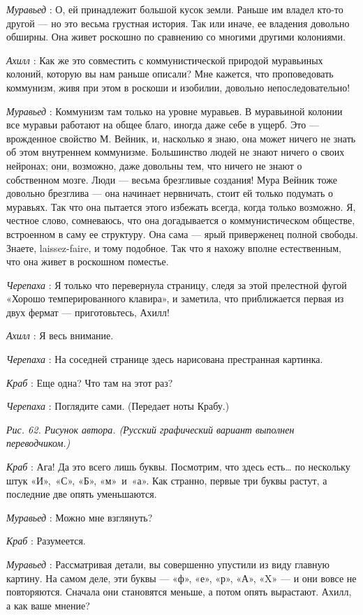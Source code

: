 \documentclass[../main.tex]{subfiles}
\begin{document}
\begin{dialogue}
\emph{Муравьед} : О, ей принадлежит большой кусок земли. Раньше им владел кто-то другой --- но это весьма грустная история. Так или иначе, ее владения довольно обширны. Она живет роскошно по сравнению со многими другими колониями.

\emph{Ахилл} : Как же это совместить с коммунистической природой муравьиных колоний, которую вы нам раньше описали? Мне кажется, что проповедовать коммунизм, живя при этом в роскоши и изобилии, довольно непоследовательно!

\emph{Муравьед} : Коммунизм там только на уровне муравьев. В муравьиной колонии все муравьи работают на общее благо, иногда даже себе в ущерб. Это --- врожденное свойство М. Вейник, и, насколько я знаю, она может ничего не знать об этом внутреннем коммунизме. Большинство людей не знают ничего о своих нейронах; они, возможно, даже довольны тем, что ничего не знают о собственном мозге. Люди --- весьма брезгливые создания! Мура Вейник тоже довольно брезглива --- она начинает нервничать, стоит ей только подумать о муравьях. Так что она пытается этого избежать всегда, когда только возможно. Я, честное слово, сомневаюсь, что она догадывается о коммунистическом обществе, встроенном в саму ее структуру. Она сама --- ярый приверженец полной свободы. Знаете, laissez-faire, и тому подобное. Так что я нахожу вполне естественным, что она живет в роскошном поместье.

\emph{Черепаха} : Я только что перевернула страницу, следя за этой прелестной фугой «Хорошо темперированного клавира», и заметила, что приближается первая из двух фермат --- приготовьтесь, Ахилл!

\emph{Ахилл} : Я весь внимание.

\emph{Черепаха} : На соседней странице здесь нарисована престранная картинка.

\emph{Краб} : Еще одна? Что там на этот раз?

\emph{Черепаха} : Поглядите сами. (Передает ноты Крабу.)

\emph{Рис. 62. Рисунок автора. (Русский графический вариант выполнен переводчиком.)}

\emph{Краб} : Ага! Да это всего лишь буквы. Посмотрим, что здесь есть\ldots{} по нескольку штук «И»,~«С», «Б», «м»~и~«а». Как странно, первые три буквы растут, а последние две опять уменьшаются.

\emph{Муравьед} : Можно мне взглянуть?

\emph{Краб} : Разумеется.

\emph{Муравьед} : Рассматривая детали, вы совершенно упустили из виду главную картину. На самом деле, эти буквы --- «ф», «е», «р», «А», «X» --- и они вовсе не повторяются. Сначала они становятся меньше, а потом опять вырастают. Ахилл, а как ваше мнение?


\end{dialogue}
\end{document}
